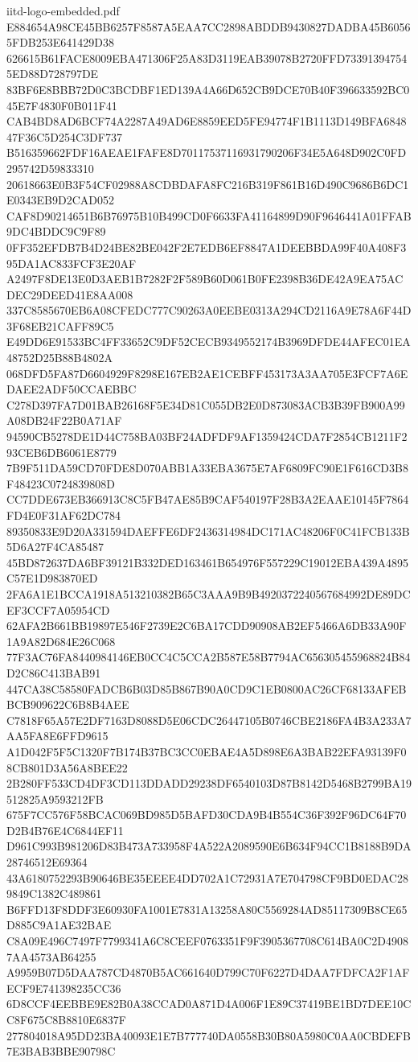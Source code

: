 \begin{filecontents*}[overwrite]{iitd-logo-embedded.pdf}
E884654A98CE45BB6257F8587A5EAA7CC2898ABDDB9430827DADBA45B60565FDB253E641429D38
626615B61FACE8009EBA471306F25A83D3119EAB39078B2720FFD733913947545ED88D728797DE
83BF6E8BBB72D0C3BCDBF1ED139A4A66D652CB9DCE70B40F396633592BC045E7F4830F0B011F41
CAB4BD8AD6BCF74A2287A49AD6E8859EED5FE94774F1B1113D149BFA684847F36C5D254C3DF737
B516359662FDF16AEAE1FAFE8D70117537116931790206F34E5A648D902C0FD295742D59833310
20618663E0B3F54CF02988A8CDBDAFA8FC216B319F861B16D490C9686B6DC1E0343EB9D2CAD052
CAF8D90214651B6B76975B10B499CD0F6633FA41164899D90F9646441A01FFAB9DC4BDDC9C9F89
0FF352EFDB7B4D24BE82BE042F2E7EDB6EF8847A1DEEBBDA99F40A408F395DA1AC833FCF3E20AF
A2497F8DE13E0D3AEB1B7282F2F589B60D061B0FE2398B36DE42A9EA75ACDEC29DEED41E8AA008
337C8585670EB6A08CFEDC777C90263A0EEBE0313A294CD2116A9E78A6F44D3F68EB21CAFF89C5
E49DD6E91533BC4FF33652C9DF52CECB9349552174B3969DFDE44AFEC01EA48752D25B88B4802A
068DFD5FA87D6604929F8298E167EB2AE1CEBFF453173A3AA705E3FCF7A6EDAEE2ADF50CCAEBBC
C278D397FA7D01BAB26168F5E34D81C055DB2E0D873083ACB3B39FB900A99A08DB24F22B0A71AF
94590CB5278DE1D44C758BA03BF24ADFDF9AF1359424CDA7F2854CB1211F293CEB6DB6061E8779
7B9F511DA59CD70FDE8D070ABB1A33EBA3675E7AF6809FC90E1F616CD3B8F48423C0724839808D
CC7DDE673EB366913C8C5FB47AE85B9CAF540197F28B3A2EAAE10145F7864FD4E0F31AF62DC784
89350833E9D20A331594DAEFFE6DF2436314984DC171AC48206F0C41FCB133B5D6A27F4CA85487
45BD872637DA6BF39121B332DED163461B654976F557229C19012EBA439A4895C57E1D983870ED
2FA6A1E1BCCA1918A513210382B65C3AAA9B9B4920372240567684992DE89DCEF3CCF7A05954CD
62AFA2B661BB19897E546F2739E2C6BA17CDD90908AB2EF5466A6DB33A90F1A9A82D684E26C068
77F3AC76FA8440984146EB0CC4C5CCA2B587E58B7794AC656305455968824B84D2C86C413BAB91
447CA38C58580FADCB6B03D85B867B90A0CD9C1EB0800AC26CF68133AFEBBCB909622C6B8B4AEE
C7818F65A57E2DF7163D8088D5E06CDC26447105B0746CBE2186FA4B3A233A7AA5FA8E6FFD9615
A1D042F5F5C1320F7B174B37BC3CC0EBAE4A5D898E6A3BAB22EFA93139F08CB801D3A56A8BEE22
2B280FF533CD4DF3CD113DDADD29238DF6540103D87B8142D5468B2799BA19512825A9593212FB
675F7CC576F58BCAC069BD985D5BAFD30CDA9B4B554C36F392F96DC64F70D2B4B76E4C6844EF11
D961C993B981206D83B473A733958F4A522A2089590E6B634F94CC1B8188B9DA28746512E69364
43A6180752293B90646BE35EEEE4DD702A1C72931A7E704798CF9BD0EDAC289849C1382C489861
B6FFD13F8DDF3E60930FA1001E7831A13258A80C5569284AD85117309B8CE65D885C9A1AE32BAE
C8A09E496C7497F7799341A6C8CEEF0763351F9F3905367708C614BA0C2D49087AA4573AB64255
A9959B07D5DAA787CD4870B5AC661640D799C70F6227D4DAA7FDFCA2F1AFECF9E741398235CC36
6D8CCF4EEBBE9E82B0A38CCAD0A871D4A006F1E89C37419BE1BD7DEE10CC8F675C8B8810E6837F
277804018A95DD23BA40093E1E7B777740DA0558B30B80A5980C0AA0CBDEFB7E3BAB3BBE90798C

\end{filecontents*}

